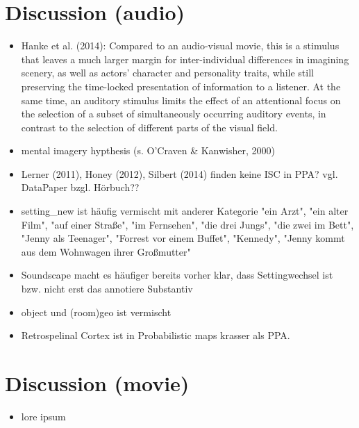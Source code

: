 \documentclass[english]{article}
\begin{document}
\section{Discussion (audio)}

\begin{itemize}
\item Hanke et al. (2014): Compared to an audio-visual movie, this is a stimulus that leaves a much larger margin for inter-individual differences in imagining scenery, as well as actors' character and personality traits, while still preserving the time-locked presentation of information to a listener. At the same time, an auditory stimulus limits the effect of an attentional focus on the selection of a subset of simultaneously occurring auditory events, in contrast to the selection of different parts of the visual field.
\item mental imagery hypthesis (s. O'Craven \& Kanwisher, 2000)
\item Lerner (2011), Honey (2012), Silbert (2014) finden keine ISC in PPA? vgl. DataPaper bzgl. Hörbuch??
\item setting\_new ist häufig vermischt mit anderer Kategorie "ein Arzt", "ein alter Film", "auf einer Straße", "im Fernsehen", "die drei Jungs", "die zwei im Bett", "Jenny als Teenager", "Forrest vor einem Buffet", "Kennedy", "Jenny kommt aus dem Wohnwagen ihrer Großmutter"
\item  Soundscape macht es häufiger bereits vorher klar, dass Settingwechsel ist bzw. nicht erst das annotiere Substantiv
\item object und (room)geo ist vermischt
\item Retrospelinal Cortex ist in Probabilistic maps krasser als PPA.
\end{itemize}

\section{Discussion (movie)}
\begin{itemize}
\item lore ipsum
\end{itemize}
\end{document}

